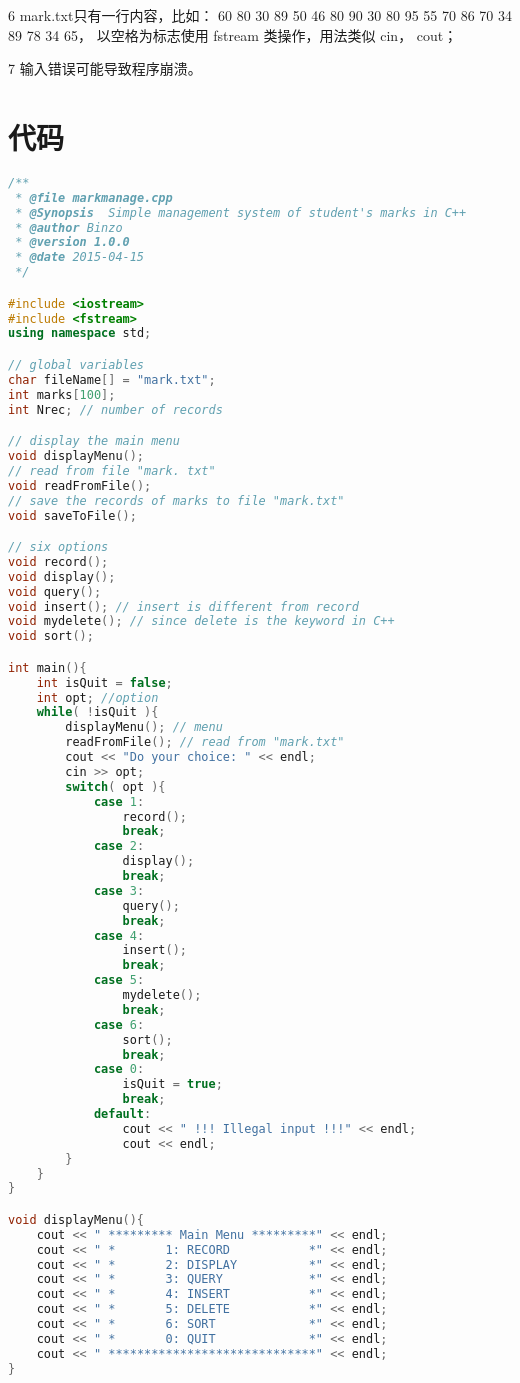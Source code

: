 \documentclass[14pt,aps,prb]{revtex4}
\begin{document}
\begin{spacing}{1.5}
6 mark.txt只有一行内容，比如： 60 80 30 89 50 46 80 90 30 80 95 55 70 86 70 34 89 78 34 65， 以空格为标志使用 fstream 类操作，用法类似 cin， cout；

7 输入错误可能导致程序崩溃。

\section{代码}
\begin{lstlisting}[language=C++]
/**
 * @file markmanage.cpp
 * @Synopsis  Simple management system of student's marks in C++
 * @author Binzo   
 * @version 1.0.0
 * @date 2015-04-15
 */

#include <iostream>
#include <fstream>
using namespace std;

// global variables
char fileName[] = "mark.txt";
int marks[100];
int Nrec; // number of records

// display the main menu
void displayMenu();
// read from file "mark. txt"
void readFromFile();
// save the records of marks to file "mark.txt"
void saveToFile();

// six options
void record();
void display();
void query();
void insert(); // insert is different from record
void mydelete(); // since delete is the keyword in C++
void sort();

int main(){
    int isQuit = false; 
    int opt; //option
    while( !isQuit ){
        displayMenu(); // menu
        readFromFile(); // read from "mark.txt"
        cout << "Do your choice: " << endl;
        cin >> opt;
        switch( opt ){
            case 1:
                record();
                break;
            case 2:
                display();
                break;
            case 3:
                query();
                break;
            case 4:
                insert();
                break;
            case 5:
                mydelete();
                break;
            case 6:
                sort();
                break;
            case 0:
                isQuit = true;
                break;
            default:
                cout << " !!! Illegal input !!!" << endl;
                cout << endl;
        }
    }
}

void displayMenu(){
    cout << " ********* Main Menu *********" << endl;
    cout << " *       1: RECORD           *" << endl;
    cout << " *       2: DISPLAY          *" << endl;
    cout << " *       3: QUERY            *" << endl;
    cout << " *       4: INSERT           *" << endl;
    cout << " *       5: DELETE           *" << endl;
    cout << " *       6: SORT             *" << endl;
    cout << " *       0: QUIT             *" << endl;
    cout << " *****************************" << endl;
}


\end{lstlisting}
\end{spacing}
\end{document}
